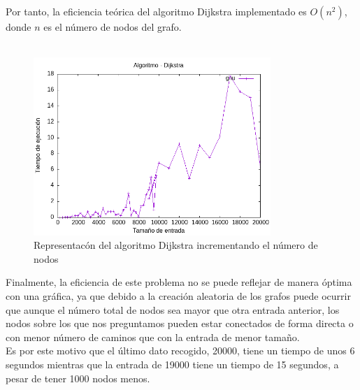 \documentclass[11pt,openany]{book}
\begin{document}
Por tanto, la eficiencia teórica del algoritmo Dijkstra implementado es $O(n^2)$, donde $n$ es el número de nodos del grafo.\\ \\
\begin{figure}[H]
      \centering
      \includegraphics[width=0.8\textwidth]{assets/Img/gnu.png}
      \caption{Representacón del algoritmo Dijkstra incrementando el número de nodos}

\end{figure}
Finalmente, la eficiencia de este problema no se puede reflejar de manera óptima con una gráfica, ya que debido a la creación aleatoria de los grafos puede ocurrir que aunque el número total de nodos 
sea mayor que otra entrada anterior, los nodos sobre los que nos preguntamos pueden estar conectados de forma directa o con menor número de caminos que con la entrada de menor tamaño. \\
Es por este motivo que el último dato recogido, 20000, tiene un tiempo de unos 6 segundos mientras que la entrada de 19000 tiene un tiempo de 15 segundos, a pesar de tener 1000 nodos menos.

      
\end{document}
